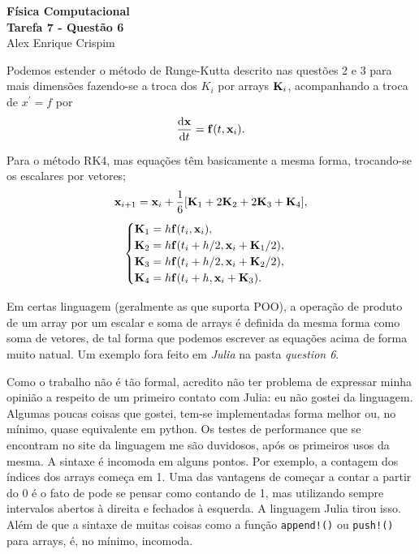 


  \begin{center}
    \LARGE \textbf{Física Computacional} \\
    \Large \textbf{Tarefa 7 - Questão 6} \\
    \large Alex Enrique Crispim
  \end{center}

  Podemos estender o método de Runge-Kutta descrito nas questões 2 e 3 para mais dimensões fazendo-se a troca dos $K_i$ por arrays $\vb{K}_i$, acompanhando a troca de $x^\prime = f$ por
  \begin{equation*}
    \dv{\vb{x}}{t} = \vb{f}(t, \vb{x}_i).
  \end{equation*}

  Para o método RK4, mas equações têm basicamente a mesma forma, trocando-se os escalares por vetores;
  \begin{equation}
    \vb{x}_{i+1} = \vb{x}_i + \frac{1}{6} \qty[\vb{K}_1 + 2 \vb{K}_2 + 2\vb{K}_3 + \vb{K}_4],
  \end{equation}
  \begin{equation*}
    \begin{cases}
      \vb{K}_1 = h \vb{f}(t_i, \vb{x}_i), \\
      \vb{K}_2 = h \vb{f}(t_i + h/2, \vb{x}_i + \vb{K}_1 / 2), \\
      \vb{K}_3 = h \vb{f}(t_i + h/2, \vb{x}_i + \vb{K}_2 / 2), \\
      \vb{K}_4 = h \vb{f}(t_i + h, \vb{x}_i + \vb{K}_3).
    \end{cases}
  \end{equation*}

  Em certas linguagem (geralmente as que suporta POO), a operação de produto de um array por um escalar e soma de arrays é definida da mesma forma como soma de vetores, de tal forma que podemos escrever as equações acima de forma muito natual. Um exemplo fora feito em \textit{Julia} na pasta \textit{question 6}.

  Como o trabalho não é tão formal, acredito não ter problema de expressar minha opinião a respeito de um primeiro contato com Julia: eu não gostei da linguagem. Algumas poucas coisas que gostei, tem-se implementadas forma melhor ou, no mínimo, quase equivalente em python. Os testes de performance que se encontram no site da linguagem me são duvidosos, após os primeiros usos da mesma. A sintaxe é incomoda em alguns pontos. Por exemplo, a contagem dos índices dos arrays começa em 1. Uma das vantagens de começar a contar a partir do 0 é o fato de pode se pensar como contando de 1, mas utilizando sempre intervalos abertos à direita e fechados à esquerda. A linguagem Julia tirou isso. Além de que a sintaxe de muitas coisas como a função \texttt{append!()} ou \texttt{push!()} para arrays, é, no mínimo, incomoda. 


